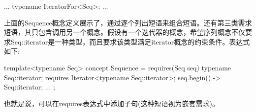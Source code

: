 \begin{cpp}
...
typename IteratorFor<Seq>;
...
\end{cpp}

上面的Sequence概念定义展示了，通过逐个列出短语来组合短语。还有第三类需求短语，其只包含调用另一个概念。假设有一个迭代器的概念，希望序列概念不仅要求Seq::iterator是一种类型，而且要求该类型满足iterator概念的约束条件。表达式如下:

\begin{cpp}
template<typename Seq>
concept Sequence = requires(Seq seq) {
	typename Seq::iterator;
	requires Iterator<typename Seq::iterator>;
	{ seq.begin() } -> Seq::iterator;
	...
};
\end{cpp}

也就是说，可以在requires表达式中添加子句(这种短语视为嵌套需求)。
















